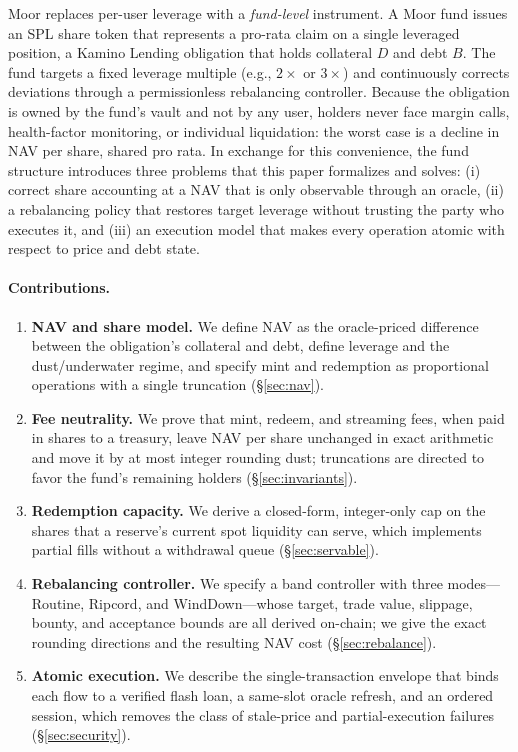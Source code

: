 \documentclass[11pt]{article}
\theoremstyle{remark}
\begin{document}
Moor replaces per-user leverage with a \emph{fund-level} instrument. A Moor fund issues an SPL share token that represents a pro-rata claim on a single leveraged position, a Kamino Lending obligation that holds collateral $D$ and debt $B$. The fund targets a fixed leverage multiple (e.g., $2\times$ or $3\times$) and continuously corrects deviations through a permissionless rebalancing controller. Because the obligation is owned by the fund's vault and not by any user, holders never face margin calls, health-factor monitoring, or individual liquidation: the worst case is a decline in NAV per share, shared pro rata. In exchange for this convenience, the fund structure introduces three problems that this paper formalizes and solves: (i) correct share accounting at a NAV that is only observable through an oracle, (ii) a rebalancing policy that restores target leverage without trusting the party who executes it, and (iii) an execution model that makes every operation atomic with respect to price and debt state.

\paragraph{Contributions.}
\begin{enumerate}
\item \textbf{NAV and share model.} We define NAV as the oracle-priced difference between the obligation's collateral and debt, define leverage and the dust/underwater regime, and specify mint and redemption as proportional operations with a single truncation (\S\ref{sec:nav}).
\item \textbf{Fee neutrality.} We prove that mint, redeem, and streaming fees, when paid in shares to a treasury, leave NAV per share unchanged in exact arithmetic and move it by at most integer rounding dust; truncations are directed to favor the fund's remaining holders (\S\ref{sec:invariants}).
\item \textbf{Redemption capacity.} We derive a closed-form, integer-only cap on the shares that a reserve's current spot liquidity can serve, which implements partial fills without a withdrawal queue (\S\ref{sec:servable}).
\item \textbf{Rebalancing controller.} We specify a band controller with three modes---Routine, Ripcord, and WindDown---whose target, trade value, slippage, bounty, and acceptance bounds are all derived on-chain; we give the exact rounding directions and the resulting NAV cost (\S\ref{sec:rebalance}).
\item \textbf{Atomic execution.} We describe the single-transaction envelope that binds each flow to a verified flash loan, a same-slot oracle refresh, and an ordered session, which removes the class of stale-price and partial-execution failures (\S\ref{sec:security}).
\end{enumerate}
\end{document}
